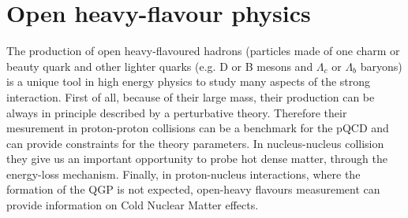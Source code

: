 \documentclass[b5paper,10pt,twoside,oldstyle,classica]{toptesi}
\begin{document}
\chapter{Open heavy-flavour physics}
The production of open heavy-flavoured hadrons (particles made of one charm or beauty quark and other lighter quarks (e.g. D or B mesons and $\Lambda_c$ or $\Lambda_b$ baryons) is a unique tool in high energy physics to study many aspects of the strong interaction. First of all, because of their large mass, their production can be always in principle described by a perturbative theory. Therefore their mesurement in proton-proton collisions can be a benchmark for the pQCD and can provide constraints for the theory parameters. 
In nucleus-nucleus collision they give us an important opportunity to probe hot dense matter, through the energy-loss mechanism. Finally, in proton-nucleus interactions, where the formation of the QGP is not expected, open-heavy flavours measurement can provide information on Cold Nuclear Matter effects.
\end{document}
